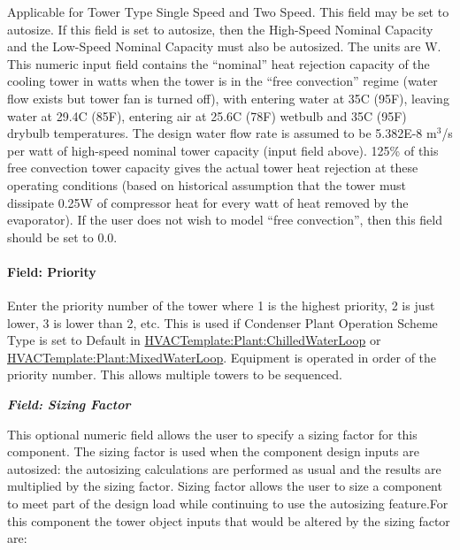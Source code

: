 Applicable for Tower Type Single Speed and Two Speed. This field may be set to autosize. If this field is set to autosize, then the High-Speed Nominal Capacity and the Low-Speed Nominal Capacity must also be autosized. The units are W. This numeric input field contains the ``nominal'' heat rejection capacity of the cooling tower in watts when the tower is in the ``free convection'' regime (water flow exists but tower fan is turned off), with entering water at 35C (95F), leaving water at 29.4C (85F), entering air at 25.6C (78F) wetbulb and 35C (95F) drybulb temperatures. The design water flow rate is assumed to be 5.382E-8 m\(^{3}\)/s per watt of high-speed nominal tower capacity (input field above). 125\% of this free convection tower capacity gives the actual tower heat rejection at these operating conditions (based on historical assumption that the tower must dissipate 0.25W of compressor heat for every watt of heat removed by the evaporator). If the user does not wish to model ``free convection'', then this field should be set to 0.0.

\paragraph{Field: Priority}\label{field-priority-2}

Enter the priority number of the tower where 1 is the highest priority, 2 is just lower, 3 is lower than 2, etc. This is used if Condenser Plant Operation Scheme Type is set to Default in \hyperref[hvactemplateplantchilledwaterloop]{HVACTemplate:Plant:ChilledWaterLoop} or \hyperref[hvactemplateplantmixedwaterloop]{HVACTemplate:Plant:MixedWaterLoop}. Equipment is operated in order of the priority number. This allows multiple towers to be sequenced.

\textbf{\emph{Field: Sizing Factor}}

This optional numeric field allows the user to specify a sizing factor for this component. The sizing factor is used when the component design inputs are autosized: the autosizing calculations are performed as usual and the results are multiplied by the sizing factor. Sizing factor allows the user to size a component to meet part of the design load while continuing to use the autosizing feature.For this component the tower object inputs that would be altered by the sizing factor are:


